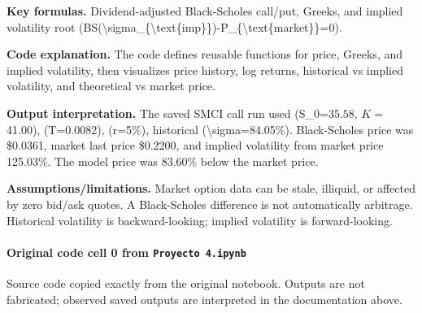 \documentclass[
  11pt,
]{article}
\begin{document}
\textbf{Key formulas.} Dividend-adjusted Black-Scholes call/put, Greeks, and implied volatility root (BS(\textbackslash sigma\_\{\textbackslash text\{imp\}\})-P\_\{\textbackslash text\{market\}\}=0).

\textbf{Code explanation.} The code defines reusable functions for price, Greeks, and implied volatility, then visualizes price history, log returns, historical vs implied volatility, and theoretical vs market price.

\textbf{Output interpretation.} The saved SMCI call run used (S\_0=\(35.58\), \(K=\)41.00), (T=0.0082), (r=5\%), historical (\textbackslash sigma=84.05\%). Black-Scholes price was \$0.0361, market last price \$0.2200, and implied volatility from market price 125.03\%. The model price was 83.60\% below the market price.

\textbf{Assumptions/limitations.} Market option data can be stale, illiquid, or affected by zero bid/ask quotes. A Black-Scholes difference is not automatically arbitrage. Historical volatility is backward-looking; implied volatility is forward-looking.

\paragraph{\texorpdfstring{Original code cell 0 from \texttt{Proyecto\ 4.ipynb}}{Original code cell 0 from Proyecto 4.ipynb}}\label{original-code-cell-0-from-proyecto-4ipynb}

Source code copied exactly from the original notebook. Outputs are not fabricated; observed saved outputs are interpreted in the documentation above.
\end{document}
